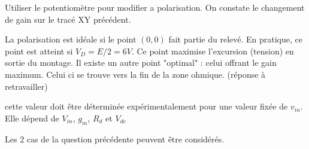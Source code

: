 \documentclass{../template/tp}
\begin{document}
{
Utiliser le potentiomètre pour modifier a polarisation. On constate le changement de gain sur le tracé XY précédent.

La polarisation est idéale si le point $(0,0)$ fait partie du relevé. En pratique, ce point est atteint si $V_D=E/2=6 V$. Ce point maximise l'excursion (tension) en sortie du montage. Il existe un autre point "optimal" : celui offrant le gain maximum. Celui ci se trouve vers la fin de la zone ohmique. (réponse à retravailler)

cette valeur doit être déterminée expérimentalement pour une valeur fixée de $v_{in}$. Elle dépend de $V_{in}$, $g_m$, $R_d$ et $V_{dc}$

Les 2 cas de la question précédente peuvent être considérés.
}
\end{document}

